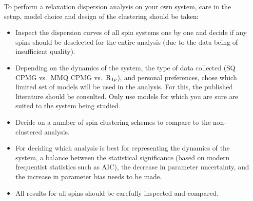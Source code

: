 To perform a relaxation dispersion analysis on your own system, care in the setup, model choice and design of the clustering should be taken:
\begin{itemize}
  \item Inspect the dispersion curves of all spin systems one by one and decide if any spins should be deselected for the entire analysis (due to the data being of insufficient quality).
  \item Depending on the dynamics of the system, the type of data collected (SQ CPMG vs.\ MMQ CPMG vs.\ $\mathrm{R}_{1\rho}$), and personal preferences, chose which limited set of models will be used in the analysis.
    For this, the published literature should be consulted.
    Only use models for which you are sure are suited to the system being studied.
  \item Decide on a number of spin clustering schemes to compare to the non-clustered analysis.
  \item For deciding which analysis is best for representing the dynamics of the system, a balance between the statistical significance (based on modern frequentist statistics such as AIC), the decrease in parameter uncertainty, and the increase in parameter bias needs to be made.
  \item All results for all spins should be carefully inspected and compared.
\end{itemize}
